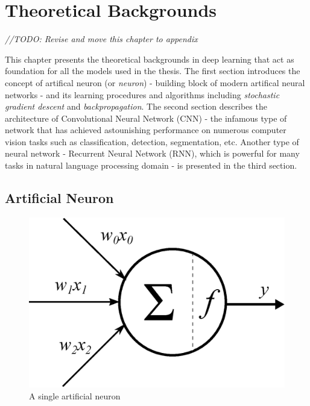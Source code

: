 \chapter{Theoretical Backgrounds}
\textit{//TODO: Revise and move this chapter to appendix}

\nocite{DBLP:journals/corr/Lipton15}

This chapter presents the theoretical backgrounds in deep learning that act as foundation for all the models used in the thesis.
The first section introduces the concept of artifical neuron (or \textit{neuron}) - building block of modern artifical neural networks - and its learning procedures and algorithms including \textit{stochastic gradient descent} and \textit{backpropagation}. The second section describes the architecture of Convolutional Neural Network (CNN) - the infamous type of network that has achieved astounishing performance on numerous computer vision tasks such as classification, detection, segmentation, etc. Another type of neural network - Recurrent Neural Network (RNN), which is powerful for many tasks in natural language processing domain - is presented in the third section. 
\section{Artificial Neuron}

\begin{figure}
	\vspace{-20pt} %
	\label{fig:neuron}
	\centering
	\includegraphics[scale=0.35]{Chapters/Fig/neuron.eps}
	\caption{A single artificial neuron}
	\vspace{-25pt} %
\end{figure}

